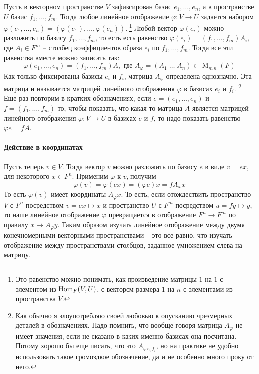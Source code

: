 Пусть в векторном пространстве $V$ зафиксирован базис $e_1,\ldots,e_n$, а в пространстве $U$ базис $f_1,\ldots, f_m$.
Тогда любое линейное отображение $\varphi\colon V\to U$ задается набором $\varphi(e_1,\ldots,e_n) = (\varphi(e_1),\ldots, \varphi(e_n))$.%
\footnote{Это равенство можно понимать, как произведение матрицы $1$ на $1$ с элементом из $\operatorname{Hom}_F(V,U)$, с вектором размера $1$ на $n$ с элементами из пространства $V$.}
Любой вектор $\varphi(e_i)$ можно разложить по базису $f_1,\ldots,f_m$, то есть есть равенство $\varphi(e_i) = (f_1,\ldots,f_m)A_i$, где $A_i\in F^m$ -- столбец коэффициентов образа $e_i$ по $f_1,\ldots,f_m$.
Тогда все эти равенства вместе можно записать так:
\[
\varphi(e_1,\ldots,e_n) = (f_1,\ldots,f_m)A, \text{ где } A_\varphi = (A_1|\ldots|A_n)\in \operatorname{M}_{m\,n}(F)
\]
Как только фиксированы базисы $e_i$ и $f_i$, матрица $A_\varphi$ определена однозначно.
Эта матрица и называется матрицей линейного отображения $\varphi$ в базисах $e_i$ и $f_i$.%
\footnote{Как обычно я злоупотребляю своей любовью к опусканию чрезмерных деталей в обозначениях.
Надо помнить, что вообще говоря матрица $A_\varphi$ не имеет значения, если не сказано в каких именно базисах она посчитана.
Потому хорошо бы еще писать, что это $A_{\varphi\,e_i\,f_i}$, но на практике не удобно использовать такое громоздкое обозначение, да и не особенно много проку от него.}
Еще раз повторим в кратких обозначениях, если $e=(e_1,\ldots,e_n)$ и $f = (f_1,\ldots,f_m)$ то, чтобы показать, что какая-то матрица $A$ является матрицей линейного отображения $\varphi\colon V\to U$ в базисах $e$ и $f$, то надо показать равенство $\varphi e = f A$.

\paragraph{Действие в координатах}

Пусть теперь $v\in V$.
Тогда вектор $v$ можно разложить по базису $e$ в виде $v = ex$, для некоторого $x\in F^n$.
Применим $\varphi$ к $v$, получим
\[
\varphi(v) = \varphi(ex) = (\varphi e)x = f A_\varphi x
\]
То есть $\varphi(v)$ имеет координаты $A_\varphi x$.
То есть, если отождествить пространство $V$ с $F^n$ посредством $v = ex \mapsto x$ и пространство $U$ с $F^m$ посредством $u = fy \mapsto y$, то наше линейное отображение $\varphi$ превращается в отображение $F^n \to F^m$ по правилу $x \mapsto A_\varphi y$.
Таким образом изучать линейное отображение между двумя конечномерными векторными пространствами -- это все равно, что изучать отображение между пространствами столбцов, заданное умножением слева на матрицу.

